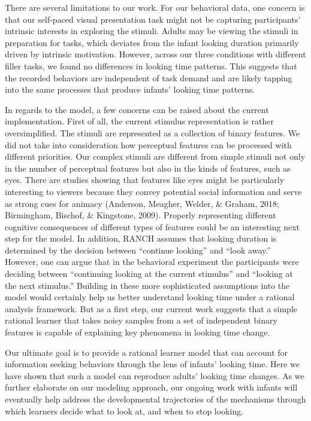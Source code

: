 \documentclass[10pt, letterpaper]{article}
\begin{document}
There are several limitations to our work. For our behavioral data, one
concern is that our self-paced visual presentation task might not be
capturing participants' intrinsic interests in exploring the stimuli.
Adults may be viewing the stimuli in preparation for tasks, which
deviates from the infant looking duration primarily driven by intrinsic
motivation. However, across our three conditions with different filler
tasks, we found no differences in looking time patterns. This suggests
that the recorded behaviors are independent of task demand and are
likely tapping into the same processes that produce infants' looking
time patterns.

In regards to the model, a few concerns can be raised about the current
implementation. First of all, the current stimulus representation is
rather oversimplified. The stimuli are represented as a collection of
binary features. We did not take into consideration how perceptual
features can be processed with different priorities. Our complex stimuli
are different from simple stimuli not only in the number of perceptual
features but also in the kinds of features, such as eyes. There are
studies showing that features like eyes might be particularly
interesting to viewers because they convey potential social information
and serve as strong cues for animacy (Anderson, Meagher, Welder, \&
Graham, 2018; Birmingham, Bischof, \& Kingstone, 2009). Properly
representing different cognitive consequences of different types of
features could be an interesting next step for the model. In addition,
RANCH assumes that looking duration is determined by the decision
between ``continue looking'' and ``look away.'' However, one can argue
that in the behavioral experiment the participants were deciding between
``continuing looking at the current stimulus'' and ``looking at the next
stimulus.'' Building in these more sophisticated assumptions into the
model would certainly help us better understand looking time under a
rational analysis framework. But as a first step, our current work
suggests that a simple rational learner that takes noisy samples from a
set of independent binary features is capable of explaining key
phenomena in looking time change.

Our ultimate goal is to provide a rational learner model that can
account for information seeking behaviors through the lens of infants'
looking time. Here we have shown that such a model can reproduce adults'
looking time changes. As we further elaborate on our modeling approach,
our ongoing work with infants will eventually help address the
developmental trajectories of the mechanisms through which learners
decide what to look at, and when to stop looking.
\end{document}
